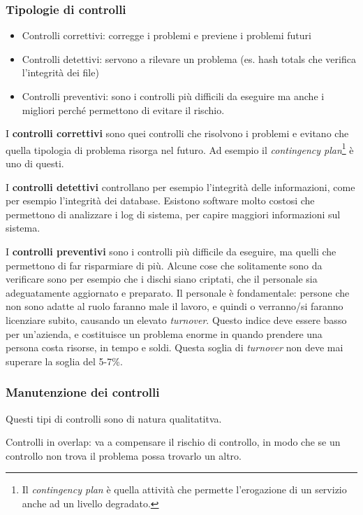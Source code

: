 \subsubsection{Tipologie di controlli}


\begin{itemize}
\item Controlli correttivi: corregge i problemi e previene i problemi futuri
\item Controlli detettivi: servono a rilevare un problema (es. hash totals che 
verifica l'integrità dei file)
\item Controlli preventivi: sono i controlli più difficili da eseguire ma anche 
i migliori perché permettono di evitare il rischio.
\end{itemize}

I \textbf{controlli correttivi} sono quei controlli che risolvono i problemi e 
evitano che quella tipologia di problema risorga nel futuro. Ad esempio il 
\textit{contingency plan}\footnote{Il \textit{contingency plan} è quella 
attività che permette l'erogazione di un servizio anche ad un livello 
degradato.} è uno di questi.

I \textbf{controlli detettivi} controllano per esempio l'integrità delle 
informazioni, come per esempio l'integrità dei database. Esistono software 
molto costosi che permettono di analizzare i log di sistema, per capire 
maggiori informazioni sul sistema.

I \textbf{controlli preventivi} sono i controlli più difficile da eseguire, ma 
quelli che permettono di far risparmiare di più. Alcune cose che solitamente 
sono da verificare sono per esempio che i dischi siano criptati, che il 
personale sia adeguatamente aggiornato e preparato.
Il personale è fondamentale: persone che non sono adatte al ruolo faranno male 
il lavoro, e quindi o verranno/si faranno licenziare subito, causando un 
elevato \textit{turnover}. Questo indice deve essere basso per un'azienda, e 
costituisce un problema enorme in quando prendere una persona costa risorse, in 
tempo e soldi. Questa soglia di \textit{turnover} non deve mai superare la 
soglia del 5-7\%.

\subsubsection{Manutenzione dei controlli}
Questi tipi di controlli sono di natura qualitatitva.

Controlli in overlap: va a compensare il rischio di controllo, in modo che se 
un controllo non trova il problema possa trovarlo un altro.

